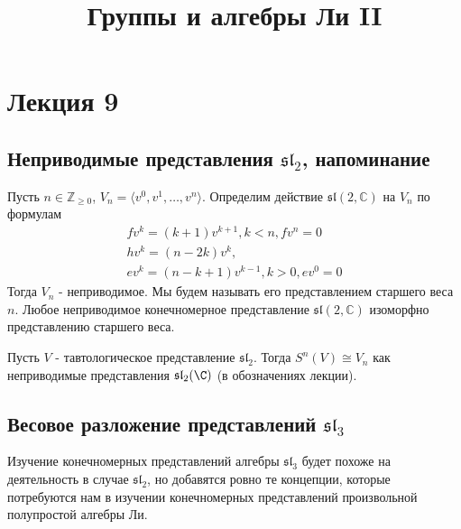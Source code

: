 \documentclass[a4article]{article}
\title{Группы и алгебры Ли II}
\author{}
\date{}
\begin{document}
\maketitle

\section*{Лекция 9}



\subsection*{Неприводимые представления $\mathfrak{sl}_2$, напоминание}
\begin{theorem}
    Пусть $n \in \mathbb{Z}_{\ge 0}$, $V_n = \langle v^0, v^1, \ldots, v^n \rangle$. Определим действие $\mathfrak{sl}(2, \mathbb{C})$ на $V_n$ по формулам
    \begin{equation}
        \begin{gathered}
            fv^k = (k+1)v^{k+1}, k < n, fv^n = 0\\
            hv^k = (n - 2k)v^k,\\
            ev^k = (n - k + 1)v^{k-1}, k > 0, ev^0 = 0
        \end{gathered}
        \label{eqs_Vn}
    \end{equation}
    Тогда $V_n$ - неприводимое. Мы будем называть его представлением старшего веса $n$. Любое неприводимое конечномерное представление $\mathfrak{sl}(2, \mathbb{C})$ изоморфно представлению старшего веса.
\end{theorem}
\begin{proposition}
    Пусть $V$ - тавтологическое представление $\mathfrak{sl}_2$. Тогда $S^n(V) \cong V_n$ как неприводимые представления $\mathfrak{sl}_2 (\C)$ (в обозначениях лекции).
\end{proposition}


\subsection*{Весовое разложение представлений $\mathfrak{sl}_3$}

Изучение конечномерных представлений алгебры $\mathfrak{sl}_3$ будет похоже на деятельность в случае $\mathfrak{sl}_2$, но добавятся ровно те концепции, которые потребуются нам в изучении конечномерных представлений произвольной полупростой алгебры Ли.
\end{document}

